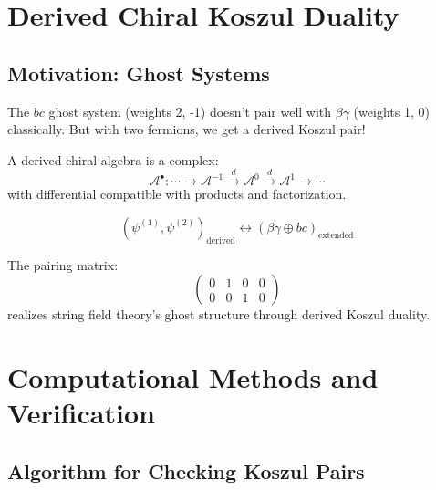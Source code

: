 
\section{Derived Chiral Koszul Duality}

\subsection{Motivation: Ghost Systems}

The $bc$ ghost system (weights 2, -1) doesn't pair well with $\beta\gamma$ (weights 1, 0) classically. But with two fermions, we get a derived Koszul pair!

\begin{definition}
A derived chiral algebra is a complex:
$$\mathcal{A}^{\bullet}: \cdots \to \mathcal{A}^{-1} \xrightarrow{d} \mathcal{A}^0 \xrightarrow{d} \mathcal{A}^1 \to \cdots$$
with differential compatible with products and factorization.
\end{definition}

\begin{theorem}
$$(\psi^{(1)}, \psi^{(2)})_{\text{derived}} \leftrightarrow (\beta\gamma \oplus bc)_{\text{extended}}$$

The pairing matrix:
$$\begin{pmatrix}
0 & 1 & 0 & 0 \\
0 & 0 & 1 & 0
\end{pmatrix}$$
realizes string field theory's ghost structure through derived Koszul duality.
\end{theorem}


\section{Computational Methods and Verification}

\subsection{Algorithm for Checking Koszul Pairs}

